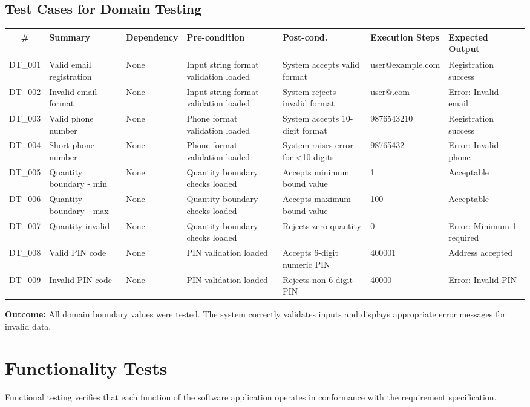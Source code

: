 \documentclass[12pt,a4paper]{report}
\begin{document}
\subsection{Test Cases for Domain Testing}

\begin{longtable}{|c|p{1.8cm}|p{1.4cm}|p{1.8cm}|p{1.8cm}|p{2.2cm}|p{1.6cm}|}
\hline
\textbf{\#} & \textbf{Summary} & \textbf{Dependency} & \textbf{Pre-condition} & \textbf{Post-cond.} & \textbf{Execution Steps} & \textbf{Expected Output} \\
\hline
\endfirsthead
DT\_001 & Valid email registration & None & Input string format validation loaded & System accepts valid format & user@example.com & Registration success \\
\hline
DT\_002 & Invalid email format & None & Input string format validation loaded & System rejects invalid format & user@.com & Error: Invalid email \\
\hline
DT\_003 & Valid phone number & None & Phone format validation loaded & System accepts 10-digit format & 9876543210 & Registration success \\
\hline
DT\_004 & Short phone number & None & Phone format validation loaded & System raises error for <10 digits & 98765432 & Error: Invalid phone \\
\hline
DT\_005 & Quantity boundary - min & None & Quantity boundary checks loaded & Accepts minimum bound value & 1 & Acceptable \\
\hline
DT\_006 & Quantity boundary - max & None & Quantity boundary checks loaded & Accepts maximum bound value & 100 & Acceptable \\
\hline
DT\_007 & Quantity invalid & None & Quantity boundary checks loaded & Rejects zero quantity & 0 & Error: Minimum 1 required \\
\hline
DT\_008 & Valid PIN code & None & PIN validation loaded & Accepts 6-digit numeric PIN & 400001 & Address accepted \\
\hline
DT\_009 & Invalid PIN code & None & PIN validation loaded & Rejects non-6-digit PIN & 40000 & Error: Invalid PIN \\
\hline
\end{longtable}

\textbf{Outcome:} All domain boundary values were tested. The system correctly validates inputs and displays appropriate error messages for invalid data.

\section{Functionality Tests}
Functional testing verifies that each function of the software application operates in conformance with the requirement specification.
\end{document}

